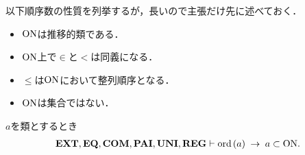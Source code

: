 	以下順序数の性質を列挙するが，長いので主張だけ先に述べておく．
	\begin{itemize}
		\item $\mathrm{ON}$は推移的類である．
		\item $\mathrm{ON}$上で$\in$と$<$は同義になる．
		\item $\leq$は$\mathrm{ON}$において整列順序となる．
		\item $\mathrm{ON}$は集合ではない．
	\end{itemize}
	
	\begin{screen}
		\begin{thm}
		\label{thm:transitive_totally_ordered_class}
			$a$を類とするとき
			\begin{align}
				\mbox{{\bf EXT}},\mbox{{\bf EQ}},\mbox{\bf COM},\mbox{{\bf PAI}},\mbox{{\bf UNI}},\mbox{{\bf REG}} \vdash 
				\operatorname*{ord}\hspace{0.15em}(a) \hspace{0.25em}\rightarrow\hspace{0.25em} a \subset \mathrm{ON}.
			\end{align}
		\end{thm}
	\end{screen}
	
